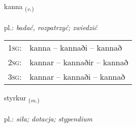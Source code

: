 \documentclass[frontgrid, backgrid]{flacards}\usepackage[]{graphicx}\usepackage[]{xcolor}
\begin{document}
\renewcommand{\flhead}{\vskip5pt \fboxsep=0pt {\small\bfseries\footnotesize Sagnorð | czasownik}}
\renewcommand{\fcfoot}{\vskip5pt \fboxsep=0pt \hspace{2pt}{\small\bfseries\footnotesize 1K}}

\renewcommand{\blhead}{\vskip5pt {\small\bfseries\footnotesize Sagnorð | czasownik }}
\renewcommand{\bcfoot}{\vskip5pt \hspace{2pt}{\small\bfseries\footnotesize 1K}}


{kanna \small{\textsubscript{(\textit{v.})}} \\[1ex] %
\textphonetic{[kʰana]} \\
pl.: \emph{badać, rozpatrzyć; zwiedzić} \\  [2ex]
\renewcommand*{\arraystretch}{0.8}
\begin{tabular}{p{1cm}l}
\textsc{1sg}: & kanna -- kannaði -- kannað \\ 
\textsc{2sg}: & kannar -- kannaðir -- kannað \\ 
\textsc{3sg}: & kannar -- kannaði -- kannað \\ 
\end{tabular}
}

\renewcommand{\flhead}{\vskip5pt \fboxsep=0pt {\small\bfseries\footnotesize Nafnorð | rzeczownik}}
\renewcommand{\fcfoot}{\vskip5pt \fboxsep=0pt \hspace{2pt}{\small\bfseries\footnotesize 1K}}

\renewcommand{\blhead}{\vskip5pt {\small\bfseries\footnotesize Nafnorð | rzeczownik }}
\renewcommand{\bcfoot}{\vskip5pt \hspace{2pt}{\small\bfseries\footnotesize 1K}}


{styrkur \small{\textsubscript{(\textit{m.})}} \\[1ex] %
 \\
pl.: \emph{siła; dotacja; stypendium} \\  [2ex]
\renewcommand*{\arraystretch}{0.8}
}
\end{document}
